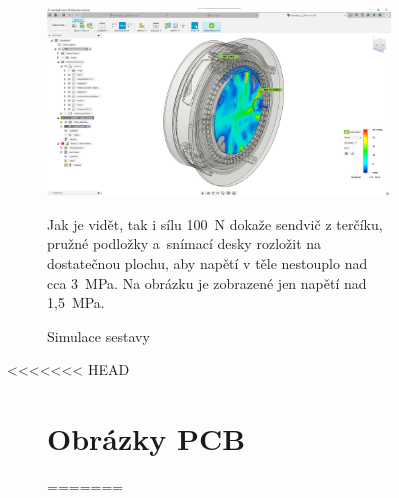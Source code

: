 \begin{figure}
\begin{figure}
    \centering
    \includegraphics[width=\textwidth]{kapitoly/obrazky/E4/machanika_tlakove_desky/simulace/zjednodusena_sestava_pri_F100N_nezobrazeno_napeti_pod_1,5MPa.png}
    \caption{Simulace sestavy}
    Jak je vidět, tak i sílu 100~N dokaže sendvič z terčíku, pružné podložky a~snímací desky rozložit na dostatečnou plochu, aby napětí v těle nestouplo 
    nad cca 3~MPa. Na obrázku je zobrazené jen napětí nad 1,5~MPa.
    \label{fig:E4-simulace_tlakovky}
\end{figure}

<<<<<<< HEAD


\begin{figure}
\section{Obrázky PCB}
    \vspace{\OdsazeniNadpisu}
=======
\begin{figure}

\end{figure}
\end{figure}
\end{figure}
